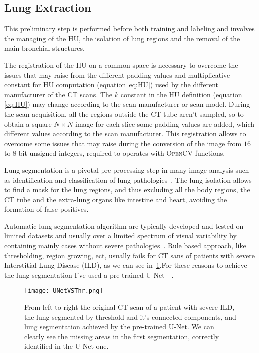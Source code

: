 \documentclass{standalone}
\begin{document}
	\subsection*{Lung Extraction}
	
	This preliminary step is performed before both training and labeling and involves the managing of the HU, the isolation of lung regions and the removal of the main bronchial structures.
	
	The registration of the HU on a common space is necessary to overcome the issues that may raise from the different padding values and multiplicative constant for HU computation (equation\,\ref{eq:HU}) used by the different manufacturer of the CT scans. The $k$ constant in the HU definition (equation\,\ref{eq:HU}) may change according to the scan manufacturer or scan model. During the scan acquisition, all the regions outside the CT tube aren't sampled, so to obtain a square $N\times N$ image for each slice some padding values are added, which different values according to the scan manufacturer. This registration allows to overcome some issues that may raise during the conversion of the image from $16$ to $8$ bit unsigned integers, required to operates with \textsc{OpenCV} functions.
	
	
	Lung segmentation is a pivotal pre-processing step in many image analysis such as identification and classification of lung pathologies~\cite{ART:Johannes}. The lung isolation allows to find a mask for the lung regions, and thus excluding  all the body regions, the CT tube and the extra-lung organs like intestine and heart, avoiding the formation of false positives.
	
	Automatic lung segmentation algorithm are typically developed and tested on limited datasets and usually over a limited spectrum of visual variability by containing mainly cases without severe pathologies~\cite{ART:Johannes}. Rule based approach, like thresholding, region growing, ect, usually fails for CT sans of patients with severe Interstitial Lung Disease (ILD), as we can see in \figurename\,\ref{fig:UNetVSThr}.For these reasons to achieve the lung segmentation I've used a pre-trained U-Net~\cite{ART:Johannes}~\cite{REP:lungmask}. 
	\begin{figure}[h!]
		\centering
		\texttt{[image: UNetVSThr.png]}
		\caption{From left to right the original CT scan of a patient with severe ILD, the lung segmented by threshold and it's connected components, and lung segmentation achieved by the pre-trained U-Net. We can clearly see the missing areas in the first segmentation, correctly identified in the U-Net one.}\label{fig:UNetVSThr}
	\end{figure}
\end{document}

